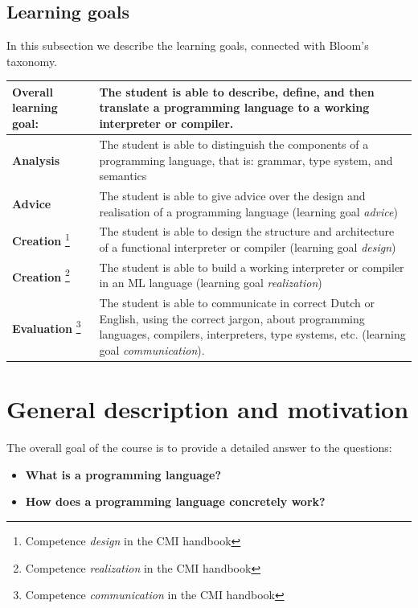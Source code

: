 \documentclass[a4paper, 10pt]{article}
\begin{document}
\subsection{Learning goals}
In this subsection we describe the learning goals, connected with Bloom's taxonomy.

\begin{tabularx}{\textwidth}{|>{\columncolor{lichtGrijs}} p{}|X|}
	\hline
	\textbf{Overall learning goal:}&
		The student is able to describe, define, and then translate a programming language to a working interpreter or compiler. \\
	\hline
	\textbf{Analysis} & The student is able to distinguish the components of a programming language, that is: grammar, type system, and semantics  \\
	\hline
	\textbf{Advice} & The student is able to give advice over the design and realisation of a programming language (learning goal \textit{advice}) \\
	\hline
	\textbf{Creation} \footnote{Competence \textit{design} in the CMI handbook} & The student is able to design the structure and architecture of a functional interpreter or compiler (learning goal \textit{design}) \\
	\hline
	\textbf{Creation} \footnote{Competence \textit{realization} in the CMI handbook} & The student is able to build a working interpreter or compiler in an ML language (learning goal \textit{realization}) \\
	\hline
	\textbf{Evaluation} \footnote{Competence \textit{communication} in the CMI handbook} & The student is able to communicate in correct Dutch or English, using the correct jargon, about programming languages, compilers, interpreters, type systems, etc. (learning goal \textit{communication}). \\
	\hline
\end{tabularx}
\newpage

\section{General description and motivation}
	The overall goal of the course is to provide a detailed answer to the questions:	
	\begin{itemize}
	\item \textbf{What is a programming language?}
	\item \textbf{How does a programming language concretely work?}
	\end{itemize}
	
\end{document}
